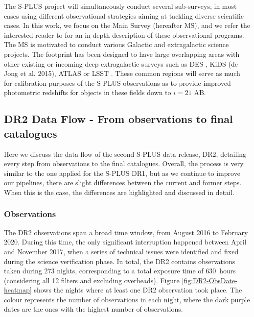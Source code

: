 \documentclass[fleqn,usenatbib]{mnras}
\begin{document}
The S-PLUS project will simultaneously conduct several sub-surveys, in most cases using different observational strategies aiming at tackling diverse scientific cases. In this work, we focus on the Main Survey (hereafter MS), and we refer the interested reader to \citet{MendesDeOliveira+2019} for an in-depth description of these observational programs. The MS is motivated to conduct various Galactic and extragalactic science projects. The footprint has been designed to have large overlapping areas with other existing or incoming deep extragalactic surveys such as DES \citep{Abbott+2018}, KiDS (de Jong et al. 2015), ATLAS \citep{Shanks+2015} or LSST \citep{Ivezic+2008, Ivezic+2019}. These common regions will serve as much for calibration purposes of the S-PLUS observations as to provide improved photometric redshifts for objects in these fields down to $i=21$ AB.

\subsection{DR2 Data Flow - From observations to final catalogues}
\label{sec:DR2_dataflow}

 Here we discuss the data flow of the second S-PLUS data release, DR2, detailing every step from observations to the final catalogues. Overall, the process is very similar to the one applied for the S-PLUS DR1, but as we continue to improve our pipelines, there are slight differences between the current and former steps. When this is the case, the differences are highlighted and discussed in detail.

\subsubsection{Observations}
\label{sec:observations}

The DR2 observations span a broad time window, from August 2016 to February 2020. During this time, the only significant interruption happened between April and November 2017, when a series of technical issues were identified and fixed during the science verification phase. In total, the DR2 contains observations taken during 273 nights, corresponding to a total exposure time of 630~hours (considering all 12 filters and excluding overheads). Figure \ref{fig:DR2-ObsDate-heatmap} shows the nights where at least one DR2 observation took place. The colour represents the number of observations in each night, where the dark purple dates are the ones with the highest number of observations.
\end{document}
